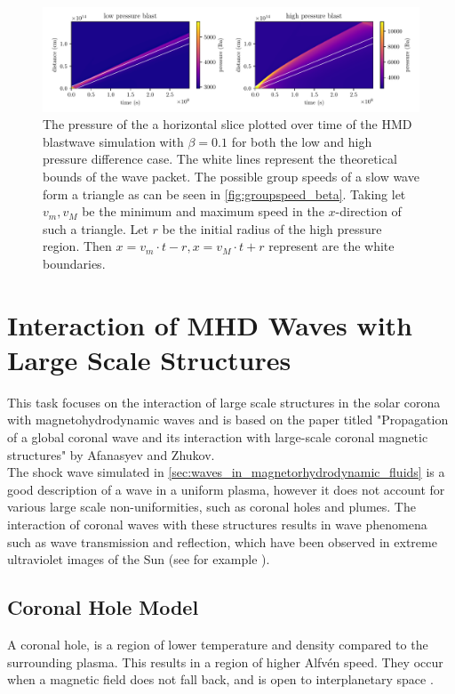 \documentclass[a4paper]{article}
\numberwithin{figure}{section}
\numberwithin{equation}{section}
\begin{document}
\begin{figure}[h]
	\centering
	\includegraphics[width=1.1\textwidth]{figures/slowwave_time.pdf}
	\caption{The pressure of the a horizontal slice plotted over time of the HMD blastwave simulation with $\beta = 0.1$ for both the low and high pressure difference case. The white lines represent the theoretical bounds of the wave packet. The possible group speeds of a slow wave form a triangle as can be seen in \cref{fig:groupspeed_beta}. Taking let $v_m, v_M$ be the minimum and maximum speed in the $x$-direction of such a triangle. Let $r$ be the initial radius of the high pressure region. Then $x = v_m \cdot t - r, x = v_M \cdot t + r$ represent are the white boundaries.}
	\label{fig:slowwave_time}
\end{figure}
\section{Interaction of MHD Waves with Large Scale Structures}
This task focuses on the interaction of large scale structures in the solar corona with magnetohydrodynamic waves and is based on the paper titled "Propagation of a global coronal wave and its interaction with large-scale coronal magnetic structures" by Afanasyev and Zhukov.  \cite{afanasyev2018propagation}\\

The shock wave simulated in \cref{sec:waves_in_magnetorhydrodynamic_fluids} is a good description of a wave in a uniform plasma, however it does not account for various large scale non-uniformities, such as coronal holes and plumes. The interaction of coronal waves with these structures results in wave phenomena such as wave transmission and reflection, which have been observed in extreme ultraviolet images of the Sun (see for example \cite{gopalswamy2009euv}).
\subsection{Coronal Hole Model}
A coronal hole, is a region of lower temperature and density compared to the surrounding plasma. This results in a region of higher Alfv\'en speed. They occur when a magnetic field does not fall back, and is open to interplanetary space .\\
\end{document}
